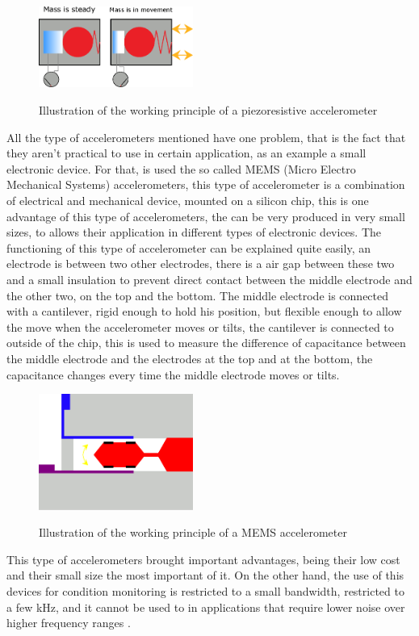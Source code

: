 \begin{figure}[!htb]
    \centering
    \includegraphics[width=0.45\textwidth]{Chapters/2CHP/Diagrams/piezoresistiveacc.eps}
    \caption{Illustration of the working principle of a piezoresistive accelerometer}{}    
    \label{fig:piezoresistiveacc}
\end{figure}
All the type of accelerometers mentioned have one problem, that is the fact that they aren't practical to use in certain application, as an example a small electronic device. For that, is used the so called MEMS (Micro Electro Mechanical Systems) accelerometers, this type of accelerometer is a combination of electrical and mechanical device, mounted on a silicon chip, this is one advantage of this type of accelerometers, the can be very produced in very small sizes, to allows their application in different types of electronic devices. The functioning of this type of accelerometer can be explained quite easily, an electrode is between two other electrodes, there is a air gap between these two and a small insulation to prevent direct contact between the middle electrode and the other two, on the top and the bottom. The middle electrode is connected with a cantilever, rigid enough to hold his position, but flexible enough to allow the move when the accelerometer moves or tilts, the cantilever is connected to outside of the chip, this is used to measure the difference of capacitance between the middle electrode and the electrodes at the top and at the bottom, the capacitance changes every time the middle electrode moves or tilts.\\
 \begin{figure}[!htb]
    \centering
    \includegraphics[width=0.45\textwidth]{Chapters/2CHP/Diagrams/memsacc.eps}
    \caption{Illustration of the working principle of a MEMS accelerometer}{}    
    \label{fig:piezoresistiveacc}
\end{figure}
This type of accelerometers brought important advantages, being their low cost and their small size the most important of it. On the other hand, the use of this devices for condition monitoring is restricted to a small bandwidth, restricted to a few kHz, and it cannot be used to in applications that require lower noise over higher frequency ranges \cite{WhatYouNeed}\cite{HowAccelerometersWork2009}.

\clearpage
\printbibliography[heading=subbibliography]
